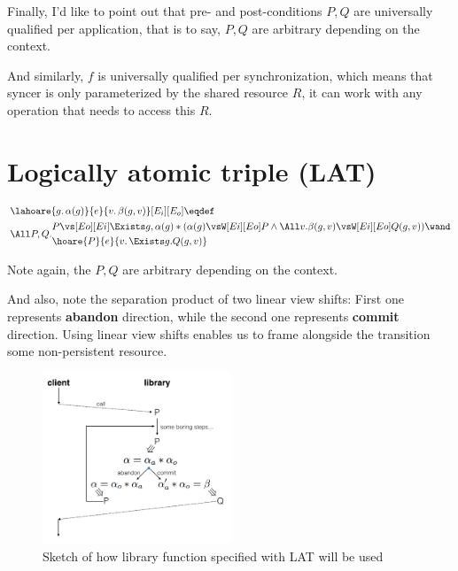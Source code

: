 \documentclass[11pt]{article}
\begin{document}
Finally, I'd like to point out that pre- and post-conditions $P, Q$ are universally qualified per application, that is to say, $P, Q$ are arbitrary depending on the context.

And similarly, $f$ is universally qualified per synchronization, which means that syncer is only parameterized by the shared resource $R$, it can work with any operation that needs to access this $R$.

\section{Logically atomic triple (LAT)}

\begin{align*}
    &\lahoare{g.\, \alpha(g)}{e}{v.\, \beta(g, v)}[E_i][E_o] \eqdef\\
    &\All P, Q.
    \begin{aligned}
          &P \vs[Eo][Ei] \Exists g, \alpha(g) * (\alpha(g) \vsW[Ei][Eo] P \land \All v. \beta(g, v) \vsW[Ei][Eo] Q(g, v)) \wand \\
          &\hoare{P}{e}{v.\, \Exists g. Q(g, v)}
    \end{aligned}
\end{align*}

Note again, the $P, Q$ are arbitrary depending on the context.

And also, note the separation product of two linear view shifts: First one represents \textbf{abandon} direction, while the second one represents \textbf{commit} direction. Using linear view shifts enables us to frame alongside the transition some non-persistent resource.

\begin{figure}[hb]
  \centering
  \includegraphics[width=0.5\textwidth]{lat}
  \caption
   {Sketch of how library function specified with LAT will be used}
\end{figure}
\end{document}
